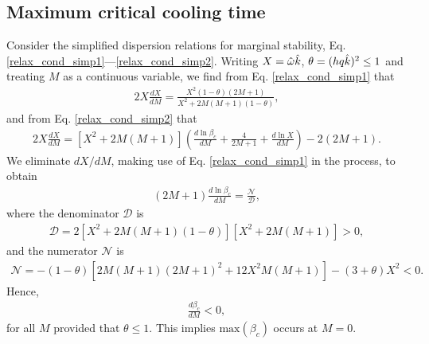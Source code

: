 \subsection{Maximum critical cooling time}\label{max_cool}
Consider the simplified dispersion relations for marginal stability,
Eq. \ref{relax_cond_simp1}---\ref{relax_cond_simp2}. Writing 
$X= \hat{\omega}\hat{k}$, $\theta = (hq\hat{k})^2\leq1$ and  treating $M$ as a
continuous variable, we find from Eq. \ref{relax_cond_simp1} that 
\begin{align}
  2 X \frac{d X}{dM} = \frac{X^2(1-\theta)(2M+1)}{X^2 +
  2M(M+1)(1-\theta)}, 
\end{align}
and from Eq. \ref{relax_cond_simp2} that
\begin{align}
  2X\frac{dX}{dM} = \left[X^2 +
  2M(M+1)\right]\left(\frac{d\ln{\beta_c}}{dM} + \frac{4}{2M+1} +
  \frac{d\ln{X}}{dM}\right) - 2(2M+1). 
\end{align}
We eliminate $dX/dM$, making use of Eq. \ref{relax_cond_simp1} in the process, to obtain 
\begin{align}
  (2M+1)\frac{d\ln{\beta_c}}{dM} = \frac{\mathcal{N}}{\mathcal{D}}, 
\end{align}
where the denominator $\mathcal{D}$ is
\begin{align}
\mathcal{D} = 2 \left[X^2 +
  2M(M+1)(1-\theta)\right]\left[X^2 + 2M(M+1)\right]>0, 
\end{align}
and the numerator $\mathcal{N}$ is 
\begin{align}
  \mathcal{N} = -(1-\theta)\left[ 2M(M+1)(2M+1)^2 + 12X^2M(M+1)\right]
  - (3+\theta)X^2 < 0.
\end{align}
Hence,
\begin{align}
  \frac{d\beta_c}{dM}<0, 
\end{align}
for all $M$ provided that $\theta\leq 1$. This implies 
$\mathrm{max}(\beta_c)$ occurs at $M=0$. 

